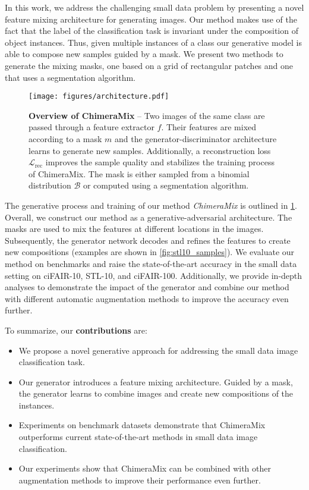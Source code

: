\documentclass{article}
\newcommand{\methodname}{ChimeraMix\xspace}
\newcommand{\cifairX}{ciFAIR-10\xspace}
\newcommand{\cifairC}{ciFAIR-100\xspace}
\newcommand{\stl}{STL-10\xspace}
\begin{document}
In this work, we address the challenging small data problem by presenting a novel feature mixing architecture for generating images. 
Our method makes use of the fact that the label of the classification task is invariant under the composition of object instances.
Thus, given multiple instances of a class our generative model is able to compose new samples guided by a mask. 
We present two methods to generate the mixing masks, one based on a grid of rectangular patches and one that uses a segmentation algorithm.



\begin{figure}[t]
	\centering
	\texttt{[image: figures/architecture.pdf]}	
	\caption{
		\textbf{Overview of \methodname} – Two images of the same class are passed through a feature extractor $f$.
		Their features are mixed according to a mask $m$ and the generator-discriminator architecture learns to generate new samples. 
		Additionally, a reconstruction loss $\mathcal{L}_{\text{rec}}$ improves the sample quality and stabilizes the training process of \methodname. 
		The mask is either sampled from a binomial distribution $\mathcal{B}$ or computed using a segmentation algorithm.
	}
	\label{fig:architecture}
\end{figure}

The generative process and training of our method \emph{\methodname} is outlined in \cref{fig:architecture}.
Overall, we construct our method as a generative-adversarial architecture.
The masks are used to mix the features at different locations in the images.
Subsequently, the generator network decodes and refines the features to create new compositions (examples are shown in \cref{fig:stl10_samples}).
We evaluate our method on benchmarks and raise the state-of-the-art accuracy in the small data setting on \cifairX, \stl, and \cifairC.
Additionally, we provide in-depth analyses to demonstrate the impact of the generator and combine our method with different automatic augmentation methods to improve the accuracy even further.

To summarize, our \textbf{contributions} are:
\begin{itemize}
    \item We propose a novel generative approach for addressing the small data image classification task.
    \item Our generator introduces a feature mixing architecture. Guided by a mask, the generator learns to combine images and create new compositions of the instances.
    \item Experiments on benchmark datasets demonstrate that \methodname outperforms current state-of-the-art methods in small data image classification.
    \item Our experiments show that \methodname can be combined with other augmentation methods to improve their performance even further.
\end{itemize}
\end{document}

